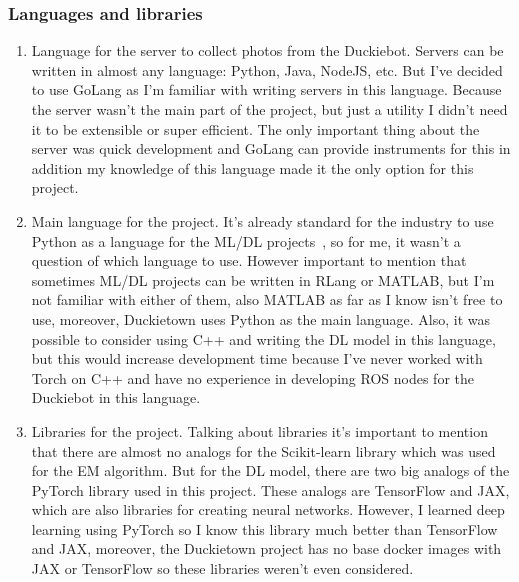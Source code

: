 \subsubsection{Languages and libraries}
\begin{enumerate}
    \item Language for the server to collect photos from the Duckiebot. Servers can be written in almost any language: Python, Java, NodeJS, etc. But I've decided 
    to use GoLang as I'm familiar with writing servers in this language. Because the server wasn't the main part of the project, but just a utility I didn't need it to 
    be extensible or super efficient. The only important thing about the server was quick development and GoLang can provide instruments for this in addition my knowledge
    of this language made it the only option for this project.
    \item Main language for the project. It's already standard for the industry to use Python as a language for the ML/DL projects~\cite{pythonForAI}, so for me, it 
    wasn't a question of which language to use. However important to mention that sometimes ML/DL projects can be written in RLang or MATLAB, but I'm not familiar
    with either of them, also MATLAB as far as I know isn't free to use, moreover, Duckietown uses Python as the main language. Also, it was possible to
    consider using C++ and writing the DL model in this language, but this would increase development time because I've never worked with Torch on C++ and have 
    no experience in developing ROS nodes for the Duckiebot in this language.
    \item Libraries for the project. Talking about libraries it's important to mention that there are almost no analogs for the Scikit-learn library which was used 
    for the EM algorithm. But for the DL model, there are two big analogs of the PyTorch library used in this project. These analogs are TensorFlow and JAX, which are 
    also libraries for creating neural networks. 
    However, I learned deep learning using PyTorch so I know this library much better than TensorFlow and JAX, moreover, the Duckietown project has no base docker images
    with JAX or TensorFlow so these libraries weren't even considered.
    
\end{enumerate}

